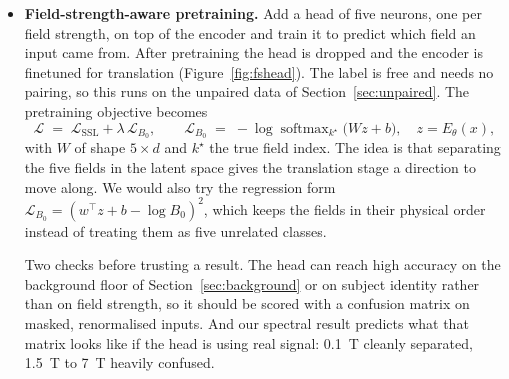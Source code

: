 \documentclass[11pt,a4paper]{article}
\begin{document}
\begin{itemize}
  \item \textbf{Field-strength-aware pretraining.} Add a head of five neurons, one per field strength,
  on top of the encoder and train it to predict which field an input came from. After pretraining the
  head is dropped and the encoder is finetuned for translation (Figure~\ref{fig:fshead}). The label is
  free and needs no pairing, so this runs on the unpaired data of Section~\ref{sec:unpaired}. The
  pretraining objective becomes
  \begin{equation}
    \mathcal{L} \;=\; \mathcal{L}_{\text{SSL}} + \lambda\,\mathcal{L}_{B_0},
    \qquad
    \mathcal{L}_{B_0} \;=\; -\log \operatorname{softmax}_{k^\star}\!\big(W z + b\big),
    \quad z = E_\theta(x),
  \end{equation}
  with $W$ of shape $5 \times d$ and $k^\star$ the true field index. The idea is that separating the
  five fields in the latent space gives the translation stage a direction to move along. We would also
  try the regression form $\mathcal{L}_{B_0} = (w^\top z + b - \log B_0)^2$, which keeps the fields in
  their physical order instead of treating them as five unrelated classes.

  Two checks before trusting a result. The head can reach high accuracy on the background floor of
  Section~\ref{sec:background} or on subject identity rather than on field strength, so it should be
  scored with a confusion matrix on masked, renormalised inputs. And our spectral result predicts what
  that matrix looks like if the head is using real signal: \SI{0.1}{\tesla} cleanly separated,
  \SI{1.5}{\tesla} to \SI{7}{\tesla} heavily confused.
\end{itemize}
\end{document}
